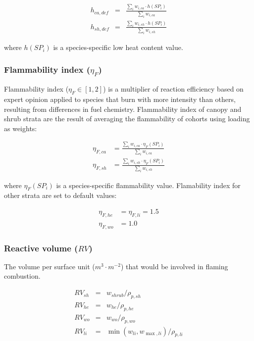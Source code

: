 \documentclass[]{book}
\begin{document}
\begin{eqnarray}
h_{ca, def} &=& \frac{\sum_{i}{w_{i,ca} \cdot h(SP_i)}}{\sum_{i}{w_{i,ca}}}\\
h_{sh, def} &=& \frac{\sum_{i}{w_{i,sh} \cdot h(SP_i)}}{\sum_{i}{w_{i,sh}}}
\end{eqnarray}

where \(h(SP_i)\) is a species-specific low heat content value.

\subsubsection{\texorpdfstring{Flammability index
(\(\eta_{F}\))}{Flammability index (\textbackslash{}eta\_\{F\})}}\label{flammability-index-eta_f}

Flammability index (\(\eta_{F} \in [1, 2]\)) is a multiplier of reaction
efficiency based on expert opinion applied to species that burn with
more intensity than others, resulting from differences in fuel
chemistry. Flammability index of canopy and shrub strata are the result
of averaging the flammability of cohorts using loading as weights:

\begin{eqnarray}
\eta_{F, ca} &= \frac{\sum_{i}{w_{i,ca} \cdot \eta_{F}(SP_i)}}{\sum_{i}{w_{i,ca}}}\\
\eta_{F, sh} &= \frac{\sum_{i}{w_{i,sh} \cdot \eta_{F}(SP_i)}}{\sum_{i}{w_{i,sh}}}
\end{eqnarray}

where \(\eta_{F}(SP_i)\) is a species-specific flammability value.
Flamability index for other strata are set to default values:

\begin{eqnarray}
\eta_{F, he} &= \eta_{F, li} = 1.5 \\
\eta_{F, wo} &= 1.0
\end{eqnarray}

\subsubsection{\texorpdfstring{Reactive volume
(\(RV\))}{Reactive volume (RV)}}\label{reactive-volume-rv}

The volume per surface unit (\(m^3\cdot m^{-2}\)) that would be involved
in flaming combustion.

\begin{eqnarray}
RV_{sh} &=& w_{shrub}/\rho_{p, sh}\\
RV_{he} &=& w_{he}/\rho_{p, he}\\
RV_{wo} &=& w_{wo}/\rho_{p, wo}\\
RV_{li} &=& \min(w_{li}, w_{\max,li})/\rho_{p, li}
\end{eqnarray}
\end{document}
